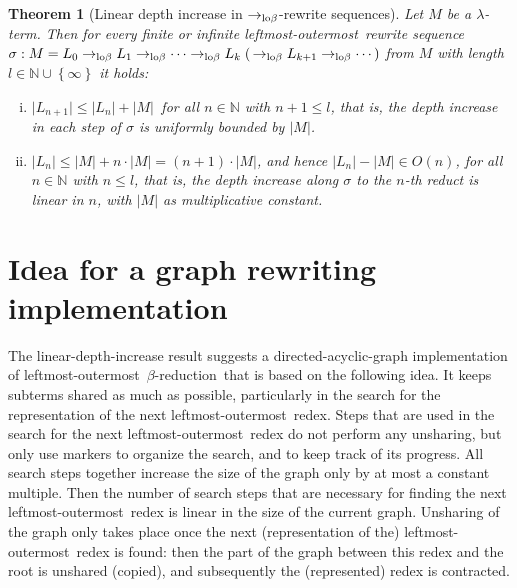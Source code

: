\documentclass[
submission
]{dmtcs-episciences-tampered}
\newcommand{\funin}{\mathrel{:}}
\newcommand{\fap}[2]{#1({#2})}
\newcommand{\indap}[2]{#1 _{#2}}
\newcommand{\nb}{\nobreakdash}
\newcommand{\nf}{\normalfont}
\newcommand{\setexp}[1]{\left\{{#1}\right\}}
\newcommand{\nat}{\mathbb{N}}
\newcommand{\sbigOmicron}{O}
\newcommand{\bigOmicron}{\fap{\sbigOmicron}}
\newcommand{\sdepth}{\text{\nf d}}
\newcommand{\depth}[1]{\lvert{#1}\rvert} \newcommand{\depthbig}[1]{\big\lvert{#1}\big\rvert} \newcommand{\sudepth}{\indap{\sdepth}{\text{\nf u}}}
\newcommand{\alter}{M}
\newcommand{\clter}{L}
\newcommand{\clteri}{\indap{\clter}}
\newcommand{\sred}{\to}
\newcommand{\sredi}{\indap{\sred}}
\newcommand{\scriptlobeta}{\text{\nf lo}\beta}
\newcommand{\slobetared}{\sredi{\scriptlobeta}}
\newcommand{\lobetared}{\mathrel{\slobetared}}
\newcommand{\arewseq}{\sigma}
\newcommand{\lambdaterm}{$\lambda$\nb-term}
\newcommand{\betareduction}{$\beta$\nb-re\-duc\-tion}
\newcommand{\lo}{left\-most-outer\-most}
\theoremstyle{plain}
\newtheorem{theorem}{Theorem}
\theoremstyle{definition}
\begin{document}
\begin{theorem}[Linear depth increase in $\lobetared$-rewrite sequences]\label{thm:main}
  Let $\alter$ be a \lambdaterm.
  Then for every finite or infinite \lo\ rewrite sequence 
  $\arewseq \funin \alter = \clteri{0} \lobetared \clteri{1} \lobetared \cdots \lobetared \clteri{k} \; (\,\lobetared \clteri{k+1} \lobetared \cdots\,)$ 
  from $\alter$  with length $l\in\nat\cup\setexp{\infty}$
  it holds:
  \begin{enumerate}[(i)]\setlength{\itemsep}{0ex}
    \item
      $\depth{\clteri{n+1}} \le \depth{\clteri{n}} + \depth{\alter}\,$
      for all $n\in\nat$ with $n+1\le l$,
      that is,
      the depth increase in each step of $\arewseq$ is uniformly bounded by $\depth{\alter}$. 
    \item  
      $\depth{\clteri{n}} \le \depth{\alter} + n\cdot \depth{\alter} = (n+1)\cdot \depth{\alter}$,
      and hence $\depth{\clteri{n}} - \depth{\alter} \in \bigOmicron{n}$,
      for all $n\in\nat$ with $n\le l$,
      that is,
      the depth increase along $\arewseq$ to the $n$\nb-th reduct is linear in $n$,
      with $\depth{\alter}$ as multiplicative constant.
  \end{enumerate}
\end{theorem}





\section{Idea for a graph rewriting implementation}
  \label{sec:idea:graph:implementation}


The linear-depth-increase result suggests a directed-acyclic-graph implementation of \lo\ \betareduction\
that is based on the following idea.
It keeps subterms shared as much as possible, particularly in the search for the
representation of the next \lo\ redex.
Steps that are used in the search for the next \lo\ redex
do not perform any unsharing, but only use markers to organize the search, and to keep track of its progress.
All search steps together increase the size of the graph only by at most a constant multiple.
Then the number of search steps that are necessary for finding the next \lo\ redex is linear in the size of the current graph. 
Unsharing of the graph only takes place once the next (representation of the) \lo\ redex is found:
then the part of the graph between this redex and the root is unshared (copied),
and subsequently the (represented) redex is contracted. 
\end{document}
